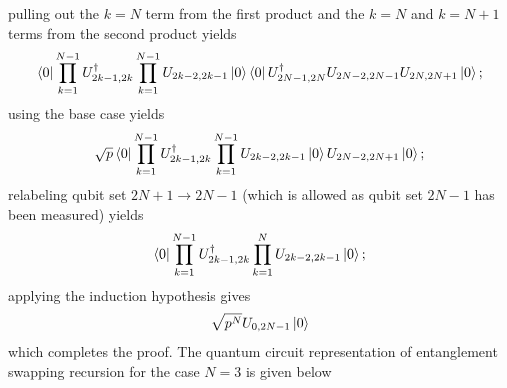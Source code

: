 \documentclass[10pt]{article}
\begin{document}
pulling out the $k=N$ term from the first product and the $k=N$ and $k=N+1$ terms from the second product yields
\begin{align}
\bra{0}\prod_{k=1}^{N-1}U^\dagger_{2k-1,2k}\prod_{k=1}^{N-1}U_{2k-2,2k-1}\ket{0}
\bra{0}U^\dagger_{2N-1,2N}U_{2N-2,2N-1}U_{2N,2N+1}\ket{0};
\end{align}
using the base case yields
\begin{align}
\sqrt{p}
\bra{0}\prod_{k=1}^{N-1}U^\dagger_{2k-1,2k}\prod_{k=1}^{N-1}U_{2k-2,2k-1}\ket{0}
U_{2N-2,2N+1}\ket{0};
\end{align}
relabeling qubit set $2N+1\to2N-1$ (which is allowed as qubit set $2N-1$ has been measured) yields
\begin{align}
\bra{0}\prod_{k=1}^{N-1}U^\dagger_{2k-1,2k}\prod_{k=1}^{N}U_{2k-2,2k-1}\ket{0};
\end{align}
applying the induction hypothesis gives
\begin{align}
\sqrt{p^{N}}U_{0,2N-1}\ket{0}
\end{align}
which completes the proof. The quantum circuit representation of entanglement swapping recursion for the case $N=3$ is given below
\end{document}
